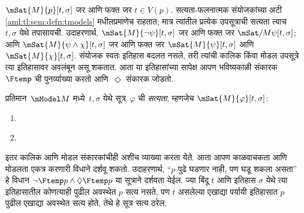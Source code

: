 $\mSat{M}{p}[t,\sigma]$ जर आणि फक्त जर $t\in V(p)$.
सत्यता-फलनात्मक संयोजकांच्या अटी
\ref{aml:tl:sem:defn:tmodels} मधीलप्रमाणेच राहतात;
मात्र त्यांतील प्रत्येक उपसूत्राची सत्यता त्याच
$t,\sigma$ येथे तपासायची. उदाहरणार्थ,
$\mSat{M}{\lnot \psi}[t,\sigma]$ जर आणि फक्त जर
$\mSat/{M}{\psi}[t,\sigma]$; आणि
$\mSat{M}{\psi\land \chi}[t,\sigma]$ जर आणि फक्त जर
$\mSat{M}{\psi}[t,\sigma]$ आणि $\mSat{M}{\chi}[t,\sigma]$.
संयोजक स्वतः इतिहास बदलत नसले, तरी त्यांची कालिक किंवा
मोडल उपसूत्रे त्या इतिहासावर अवलंबून असू शकतात.
आता या इतिहासांच्या सापेक्ष आपण
भविष्यकाळी संकारक~$\Ftemp$ ची पुनर्व्याख्या करतो
आणि~$\Diamond$ संकारक जोडतो.
\begin{defn}\label{aml:tl:poss:defn:phmodels}
  प्रतिमान~$\mModel M$ मध्ये~$t, \sigma$ येथे
  सूत्र~$\varphi$ ची \emph{सत्यता}, म्हणजेच
  $\mSat{M}{\varphi}[t, \sigma]$:
  \begin{enumerate}
  \item\label{aml:tl:poss:defn:sub:phmodels-f} 
  \item\label{aml:tl:poss:defn:sub:phmodels-diamond} 
  \end{enumerate}
\end{defn}
इतर कालिक आणि मोडल संकारकांचीही अशीच व्याख्या
करता येते. आता आपण काळवाचकता आणि मोडलता
एकत्र करणारी विधाने दर्शवू शकतो. उदाहरणार्थ,
``$p$ पुढे घडणार नाही, पण घडू शकला असता'' हे
विधान $\lnot \Ftemp p \land \Diamond \Ftemp p$
या सूत्राने दर्शवता येईल. ज्या बिंदू $t$ आणि इतिहास $\sigma$ येथे
त्या इतिहासातील कोणत्याही पुढील अवस्थेत $p$ सत्य नसते,
पण $t$ असलेल्या एखाद्या पर्यायी इतिहासात $p$ पुढील
एखाद्या अवस्थेत सत्य होते, तेथे हे सूत्र सत्य ठरेल.
